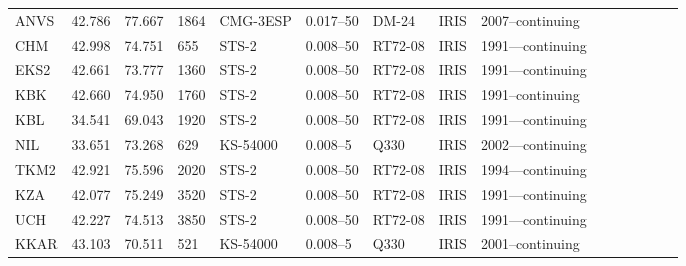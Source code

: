 \begin{table}[]
{\begin{tabular}{lp{1cm}lp{2cm}lp{2cm}lp{2cm}llp{2cm}lp{2cm}ll}
ANVS & 42.786        & 77.667         & 1864          & CMG-3ESP     & 0.017–50          & DM-24            & IRIS    & 2007–continuing             \\
CHM  & 42.998        & 74.751         & 655           & STS-2        & 0.008–50          & RT72-08          & IRIS    & 1991—continuing             \\
EKS2 & 42.661        & 73.777         & 1360          & STS-2        & 0.008–50          & RT72-08          & IRIS    & 1991—continuing             \\
KBK  & 42.660        & 74.950         & 1760          & STS-2        & 0.008–50          & RT72-08          & IRIS    & 1991–continuing             \\
KBL  & 34.541        & 69.043         & 1920          & STS-2        & 0.008–50          & RT72-08          & IRIS    & 1991—continuing             \\
NIL  & 33.651        & 73.268         & 629           & KS-54000     & 0.008–5           & Q330             & IRIS    & 2002—continuing             \\
TKM2 & 42.921        & 75.596         & 2020          & STS-2        & 0.008–50          & RT72-08          & IRIS    & 1994—continuing             \\
KZA  & 42.077        & 75.249         & 3520          & STS-2        & 0.008–50          & RT72-08          & IRIS    & 1991—continuing             \\
UCH  & 42.227        & 74.513         & 3850          & STS-2        & 0.008–50          & RT72-08          & IRIS    & 1991—continuing             \\
KKAR & 43.103        & 70.511         & 521           & KS-54000     & 0.008–5           & Q330             & IRIS    & 2001–continuing            
\end{tabular}}
\end{table}
